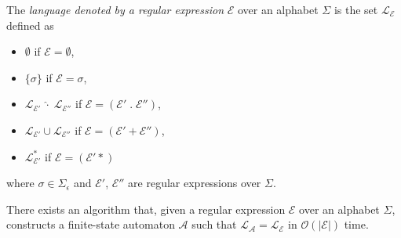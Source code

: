 \begin{definition}
  The \emph{language denoted by a regular expression} $\mathcal{E}$ over an alphabet
  $\Sigma$ is the set $\mathcal{L}_\mathcal{E}$ defined as
  \begin{itemize}
    \item $\emptyset$ if $\mathcal{E} = \emptyset$,
    \item $\{ \sigma \}$ if $\mathcal{E} = \sigma$,
    \item $\mathcal{L}_{\mathcal{E}'}\;\hat{\cdot}\;\mathcal{L}_{\mathcal{E}''}$ if
	    $\mathcal{E} = (\mathcal{E}'\;.\;\mathcal{E}'')$,
    \item $\mathcal{L}_{\mathcal{E}'} \cup \mathcal{L}_{\mathcal{E}''}$ if
	    $\mathcal{E} = (\mathcal{E}'+\mathcal{E}'')$,
    \item $\mathcal{L}_{\mathcal{E}'}^*$ if $\mathcal{E} = (\mathcal{E}'*)$
  \end{itemize}
  where $\sigma \in \Sigma_\epsilon$ and $\mathcal{E}'$, $\mathcal{E}''$ are regular
  expressions over $\Sigma$.
\end{definition}

\begin{theorem}
  \label{thm:thompson}
  There exists an algorithm that, given a regular expression $\mathcal{E}$ over an
  alphabet $\Sigma$, constructs a finite-state automaton $\mathcal{A}$ such that
  $\mathcal{L}_\mathcal{A} = \mathcal{L}_\mathcal{E}$ in $\mathcal{O}(|\mathcal{E}|)$
  time.
\end{theorem}

